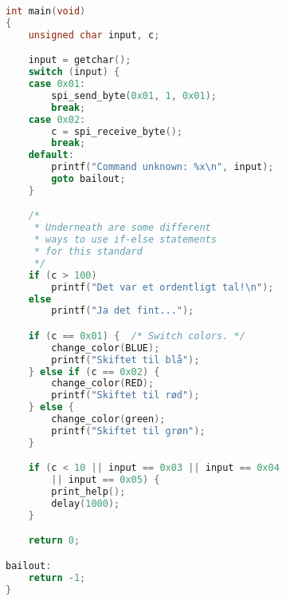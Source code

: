\documentclass[article, 10pt]{memoir}
\begin{document}
\begin{landscape}
\begin{multicols}{2}
\begin{lstlisting}[language=c]
int main(void)
{
    unsigned char input, c;

    input = getchar();
    switch (input) {
    case 0x01:
        spi_send_byte(0x01, 1, 0x01);
        break;
    case 0x02:
        c = spi_receive_byte();
        break;
    default:
        printf("Command unknown: %x\n", input);
        goto bailout;
    }

    /* 
     * Underneath are some different 
     * ways to use if-else statements
     * for this standard 
     */
    if (c > 100)
        printf("Det var et ordentligt tal!\n");
    else
        printf("Ja det fint...");

    if (c == 0x01) {  /* Switch colors. */
        change_color(BLUE);
        printf("Skiftet til blå");
    } else if (c == 0x02) {
        change_color(RED);
        printf("Skiftet til rød");
    } else {
        change_color(green);
        printf("Skiftet til grøn");
    }

    if (c < 10 || input == 0x03 || input == 0x04
        || input == 0x05) {
        print_help();
        delay(1000);
    }

    return 0;

bailout:
    return -1;
}
        \end{lstlisting}
    \end{multicols}
\end{landscape}
\end{document}
